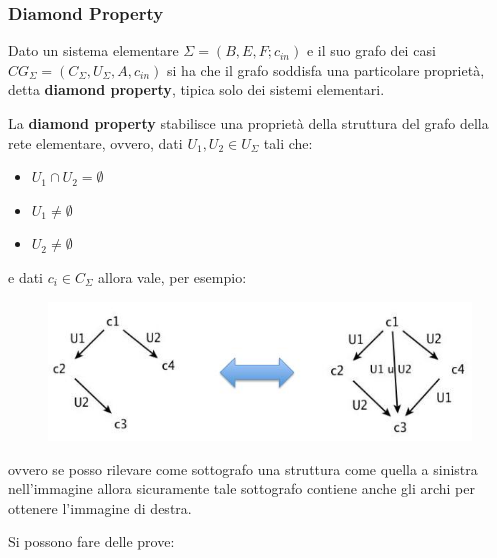 \subsubsection{Diamond Property}
Dato un sistema elementare $\Sigma = (B, E, F;c_{in})$ e il suo grafo dei casi
$CG_\Sigma=(C_\Sigma, U_\Sigma, A, c_{in})$ si ha 
che il grafo soddisfa una particolare proprietà, detta \textbf{diamond
  property}, tipica solo dei sistemi elementari.
\begin{definizione}
  La \textbf{diamond property} stabilisce una proprietà della struttura del
  grafo della rete elementare, ovvero, dati $U_1, U_2\in U_\Sigma$ tali che:
  \begin{itemize}
    \item $U_1\cap U_2=\emptyset$
    \item $U_1\neq\emptyset$
    \item $U_2\neq\emptyset$
  \end{itemize}
  e dati $c_i\in C_\Sigma$ allora vale, per esempio:
  \begin{figure}[H]
    \centering
    \includegraphics[scale = 0.6]{img/diam.jpg}
    \label{fig:dia}
    \caption{}
  \end{figure}
  ovvero se posso rilevare come sottografo una struttura come quella a sinistra
  nell'immagine allora sicuramente tale sottografo contiene anche gli
  archi per ottenere l'immagine di destra. 
\end{definizione} \vspace{5mm} %
Si possono fare delle prove:
